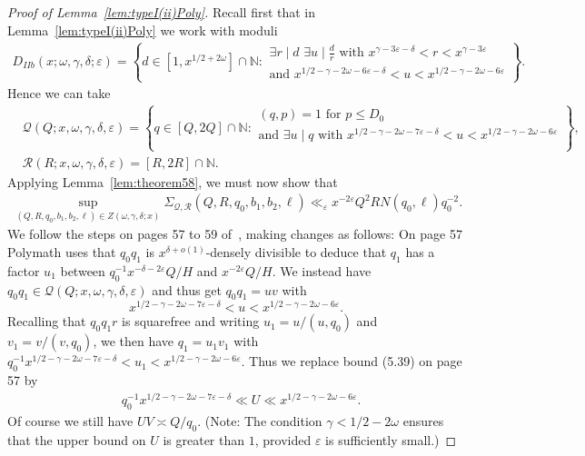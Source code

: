 \documentclass{amsart}
\numberwithin{equation}{section}
\begin{document}
\begin{proof}[Proof of Lemma~\ref{lem:typeI(ii)Poly}] 
Recall first that in Lemma~\ref{lem:typeI(ii)Poly} we work with moduli \begin{align*}
D_{IIb}(x;\omega,\gamma,\delta;\varepsilon) = \left\{d \in  [1, x^{1/2+2\omega}]\cap \mathbb{N}:  \begin{array}{l} 
\exists r \mid d \,\, \exists u \mid \frac{d}{r} \mbox{ with } x^{\gamma -3\varepsilon-\delta} < r < x^{\gamma - 3\varepsilon} \\ \mbox{and } x^{1/2 -\gamma-2\omega -6 \varepsilon-\delta } < u < x^{1/2-\gamma-2\omega  -6\varepsilon}
\end{array}\right\}.
\end{align*}
Hence    we can  take
\begin{align*}
&\mathcal{Q}(Q;x,\omega,\gamma,\delta,\varepsilon)=\left\{q\in [Q,2Q] \cap \mathbb{N}: 
 \begin{array}{l}  (q,p)=1 \mbox{ for } p \leq D_0 \\ \mbox{and }
\exists u \mid q \mbox{ with }x^{1/2 -\gamma-2\omega -7 \varepsilon-\delta } < u < x^{1/2-\gamma-2\omega  -6\varepsilon} \\
\end{array}\right\},\\
&\mathcal{R}(R;x,\omega,\gamma,\delta,\varepsilon)=[R,2R] \cap \mathbb{N}.
\end{align*}
Applying Lemma~\ref{lem:theorem58}, we must now show that 
\begin{align}\label{inequ:basic.poly(ii)}
\sup_{(Q,R,q_0,b_1,b_2,\ell) \in Z(\omega,\gamma,\delta;x)}\Sigma_{\mathcal{Q},\mathcal{R}}(Q,R,q_0,b_1,b_2,\ell) \ll_\varepsilon x^{-2\varepsilon} Q^2RN (q_0, \ell) q_0^{-2}.
\end{align}
We follow the steps on pages 57 to 59 of~\cite{Polymath:2014:EDZ}, making changes as follows: On page 57 Polymath uses that $q_0q_1$  is $x^{\delta+o(1)}$-densely divisible to deduce that $q_1$ has a factor $u_1$ between $q_0^{-1} x^{-\delta-2\varepsilon} Q/H$ and $ x^{-2\varepsilon} Q/H$. We instead have $q_0q_1 \in \mathcal{Q}(Q;x,\omega,\gamma,\delta,\varepsilon)$ and thus get $q_0q_1=u v$ with
$$x^{1/2 -\gamma-2\omega -7 \varepsilon-\delta } < u < x^{1/2-\gamma-2\omega  -6\varepsilon}.$$
Recalling that $q_0q_1r$ is squarefree and writing $u_1=u/(u,q_0)$ and $v_1 = v/(v,q_0)$, we then have $q_1 =u_1 v_1$ with 
$q_0^{-1} x^{1/2 -\gamma-2\omega -7 \varepsilon-\delta } < u_1 < x^{1/2-\gamma-2\omega  -6\varepsilon}.$ 
Thus we replace bound (5.39)  on page 57 by
\begin{align*}
&q_0^{-1} x^{1/2 -\gamma-2\omega -7 \varepsilon-\delta }  \ll U \ll x^{1/2-\gamma-2\omega  -6\varepsilon}.
\end{align*} 
Of course we still have $UV \asymp Q/q_0$. 
(Note: The condition $\gamma < 1/2 - 2\omega $ ensures that the upper bound on $U$ is greater than $1$, provided $\varepsilon$ is sufficiently small.) \medskip


\end{proof}
\end{document}
